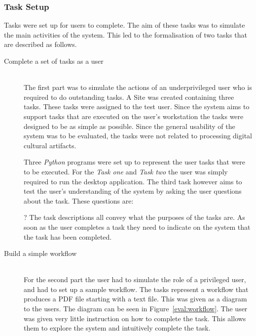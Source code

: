 \documentclass[12pt,a4paper]{report}
\begin{document}
\subsubsection{Task Setup}
Tasks were set up for users to complete. The aim of these tasks was to simulate
the main activities of the system. This led to the formalisation of two tasks
that are described as follows.
\begin{description}
\item[Complete a set of tasks as a user] \hfill \\
    The first part was to simulate the actions of an underprivileged user
    who is required to do outstanding tasks.  A Site was created containing three
    tasks. These tasks were assigned to the test user. Since the system aims to
    support tasks that are executed on the user's workstation the tasks were
    designed to be as simple as possible. Since the general usability of the system
    was to be evaluated, the tasks were not related to processing digital cultural
    artifacts.

    Three \emph{Python} programs were set up to represent the user tasks
    that were to be executed. For the \emph{Task one} and \emph{Task two}
    the user was simply required to run the desktop application. The third
    task however aims to test the user's understanding of the system by
    asking the user questions about the task. These questions are:
    ?   The task descriptions all convey what the purposes
    of the tasks are. As soon as the user completes a task they need to
    indicate on the system that the task has been completed. 
\item[Build a simple workflow] \hfill \\
    For the second part the user had to simulate the role of a privileged
    user, and had to set up a sample workflow. The tasks represent a workflow
    that produces a PDF file starting with a text file. This was given as a
    diagram to the users. The diagram can be seen in Figure~\ref{eval:workflow}.
        The user was given very little instruction on how to complete the task. 
    This allows them to explore the system and intuitively complete the task.
    
\end{description}
\end{document}
